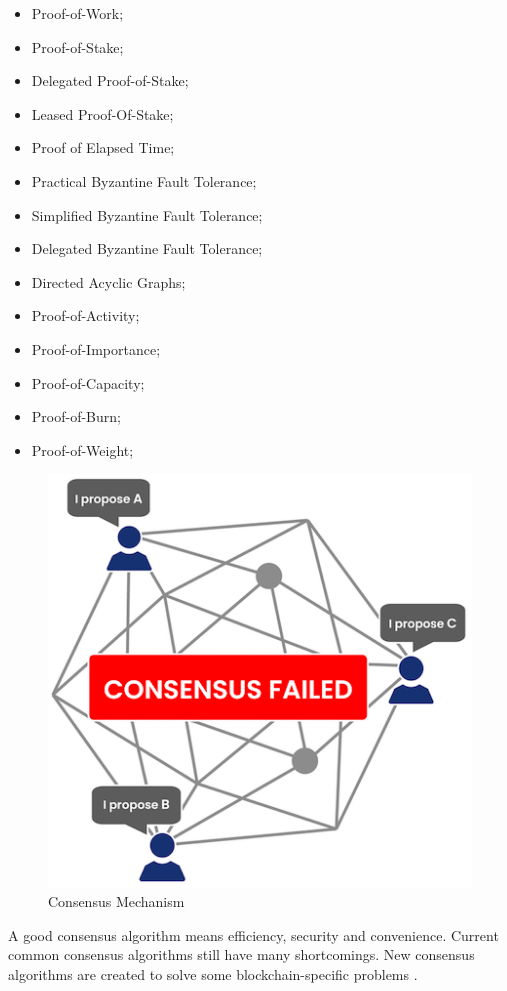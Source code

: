 \begin{itemize}
\item Proof-of-Work;
\item Proof-of-Stake;
\item Delegated Proof-of-Stake;
\item Leased Proof-Of-Stake;
\item Proof of Elapsed Time;
\item Practical Byzantine Fault Tolerance;
\item Simplified Byzantine Fault Tolerance;
\item Delegated Byzantine Fault Tolerance;
\item Directed Acyclic Graphs;
\item Proof-of-Activity;
\item Proof-of-Importance;
\item Proof-of-Capacity;
\item Proof-of-Burn;
\item Proof-of-Weight;
\end{itemize}

\begin{figure}[htbp]
\begin{center}
  \includegraphics[scale=0.55]{images/consensus.png}
\caption{Consensus Mechanism}
\label{fig:Consensus}
\end{center}
\end{figure}

A good consensus algorithm means efficiency, security and convenience. Current common consensus algorithms still have many shortcomings. New consensus algorithms are created to solve some blockchain-specific problems \cite{zheng2016blockchain}.

